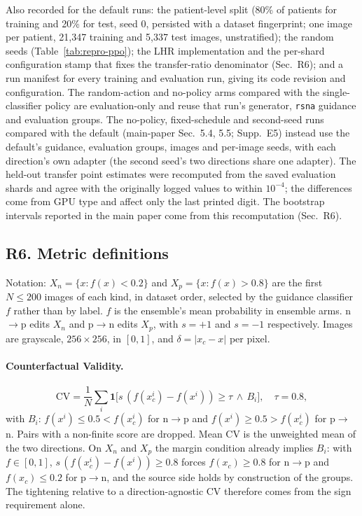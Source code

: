 Also recorded for the default runs: the patient-level split (80\% of patients for training and 20\% for test, seed 0, persisted with a dataset fingerprint; one image per patient, 21{,}347 training and 5{,}337 test images, unstratified); the random seeds (Table~\ref{tab:repro-ppo}); the LHR implementation and the per-shard configuration stamp that fixes the transfer-ratio denominator (Sec.~R6); and a run manifest for every training and evaluation run, giving its code revision and configuration. The random-action and no-policy arms compared with the single-classifier policy are evaluation-only and reuse that run's generator, \texttt{rsna} guidance and evaluation groups. The no-policy, fixed-schedule and second-seed runs compared with the default (main-paper Sec.~5.4, 5.5; Supp.~E5) instead use the default's guidance, evaluation groups, images and per-image seeds, with each direction's own adapter (the second seed's two directions share one adapter). The held-out transfer point estimates were recomputed from the saved evaluation shards and agree with the originally logged values to within $10^{-4}$; the differences come from GPU type and affect only the last printed digit. The bootstrap intervals reported in the main paper come from this recomputation (Sec.~R6).

\subsection*{R6. Metric definitions}
\label{sec:repro-metrics}

Notation: $X_n = \{x : f(x) < 0.2\}$ and $X_p = \{x : f(x) > 0.8\}$ are the first $N \leq 200$ images of each kind, in dataset order, selected by the guidance classifier $f$ rather than by label. $f$ is the ensemble's mean probability in ensemble arms. n$\to$p edits $X_n$ and p$\to$n edits $X_p$, with $s = +1$ and $s = -1$ respectively. Images are grayscale, $256 \times 256$, in $[0, 1]$, and $\delta = |x_c - x|$ per pixel.

\paragraph{Counterfactual Validity.}
\begin{equation*}
\mathrm{CV} = \frac{1}{N}\sum_{i} \mathbf{1}\big[s\,(f(x_c^i) - f(x^i)) \geq \tau \,\wedge\, B_i\big], \quad \tau = 0.8,
\end{equation*}
with $B_i$: $f(x^i) \leq 0.5 < f(x_c^i)$ for n$\to$p and $f(x^i) \geq 0.5 > f(x_c^i)$ for p$\to$n. Pairs with a non-finite score are dropped. Mean CV is the unweighted mean of the two directions. On $X_n$ and $X_p$ the margin condition already implies $B_i$: with $f \in [0, 1]$, $s\,(f(x_c^i) - f(x^i)) \geq 0.8$ forces $f(x_c) \geq 0.8$ for n$\to$p and $f(x_c) \leq 0.2$ for p$\to$n, and the source side holds by construction of the groups. The tightening relative to a direction-agnostic CV therefore comes from the sign requirement alone.

